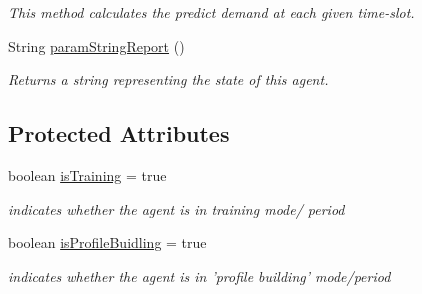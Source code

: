 \begin{DoxyCompactItemize}
\begin{DoxyCompactList}\small\item\em This method calculates the predict demand at each given time-\/slot. \end{DoxyCompactList}\item 
String \hyperlink{classuk_1_1ac_1_1dmu_1_1iesd_1_1cascade_1_1agents_1_1aggregators_1_1_supplier_co_advanced_model_a62f8d10d4f3ff89951091748a4c21972}{param\-String\-Report} ()
\begin{DoxyCompactList}\small\item\em Returns a string representing the state of this agent. \end{DoxyCompactList}\end{DoxyCompactItemize}
\subsection*{Protected Attributes}
\begin{DoxyCompactItemize}
\item 
\hypertarget{classuk_1_1ac_1_1dmu_1_1iesd_1_1cascade_1_1agents_1_1aggregators_1_1_supplier_co_advanced_model_aae297d99eec71cf412581ee48b413b31}{boolean \hyperlink{classuk_1_1ac_1_1dmu_1_1iesd_1_1cascade_1_1agents_1_1aggregators_1_1_supplier_co_advanced_model_aae297d99eec71cf412581ee48b413b31}{is\-Training} = true}\label{classuk_1_1ac_1_1dmu_1_1iesd_1_1cascade_1_1agents_1_1aggregators_1_1_supplier_co_advanced_model_aae297d99eec71cf412581ee48b413b31}

\begin{DoxyCompactList}\small\item\em indicates whether the agent is in training mode/ period \end{DoxyCompactList}\item 
\hypertarget{classuk_1_1ac_1_1dmu_1_1iesd_1_1cascade_1_1agents_1_1aggregators_1_1_supplier_co_advanced_model_a95569aa5dfc17d74257b0021dfcb6c89}{boolean \hyperlink{classuk_1_1ac_1_1dmu_1_1iesd_1_1cascade_1_1agents_1_1aggregators_1_1_supplier_co_advanced_model_a95569aa5dfc17d74257b0021dfcb6c89}{is\-Profile\-Buidling} = true}\label{classuk_1_1ac_1_1dmu_1_1iesd_1_1cascade_1_1agents_1_1aggregators_1_1_supplier_co_advanced_model_a95569aa5dfc17d74257b0021dfcb6c89}

\begin{DoxyCompactList}\small\item\em indicates whether the agent is in 'profile building' mode/period \end{DoxyCompactList}\end{DoxyCompactItemize}
